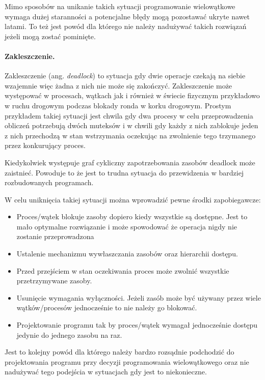 Mimo sposobów na unikanie takich sytuacji programowanie wielowątkowe wymaga dużej staranności a potencjalne błędy mogą pozostawać ukryte nawet latami. To też jest powód dla którego nie należy nadużywać takich rozwiązań jeżeli mogą zostać pominięte\cite{multi thread problem}.
\paragraph{Zakleszczenie.}

Zakleszczenie (ang. \textit{deadlock}) to sytuacja gdy dwie operacje czekają na siebie wzajemnie więc żadna z nich nie może się zakończyć. 
Zakleszczenie może występować w procesach, wątkach jak i również w świecie fizycznym przykładowo w ruchu drogowym podczas blokady ronda w korku drogowym.  
Prostym przykładem takiej sytuacji jest chwila gdy dwa procesy w celu przeprowadzenia obliczeń potrzebują dwóch muteksów i w chwili gdy każdy z nich zablokuje jeden z nich przechodzą w stan wstrzymania oczekując na zwolnienie tego trzymanego przez konkurujący proces. 

 Kiedykolwiek występuje graf cykliczny zapotrzebowania zasobów deadlock może zaistnieć. 
 Powoduje to że jest to trudna sytuacja do przewidzenia w bardziej rozbudowanych programach.

W celu uniknięcia takiej sytuacji można wprowadzić pewne środki zapobiegawcze\cite{coffman}:
\begin{itemize}
        \item Proces/wątek blokuje zasoby dopiero kiedy wszystkie są dostępne. Jest to mało optymalne rozwiązanie i może spowodować że operacja nigdy nie zostanie przeprowadzona
        \item Ustalenie mechanizmu wywłaszczania zasobów oraz hierarchii dostępu. 
        \item Przed przejściem w stan oczekiwania proces może zwolnić wszystkie przetrzymywane zasoby. 
        \item Usunięcie wymagania wyłączności. Jeżeli zasób może być używany przez wiele wątków/procesów jednocześnie to nie należy go blokować.  
        \item Projektowanie programu tak by proces/wątek wymagał jednocześnie dostępu jedynie do jednego zasobu na raz. 
\end{itemize} 

Jest to kolejny powód dla którego należy bardzo rozsądnie podchodzić do projektowania programu przy decyzji programowania wielowątkowego oraz nie nadużywać tego podejścia w sytuacjach gdy jest to niekonieczne\cite{multi thread problem}. 

